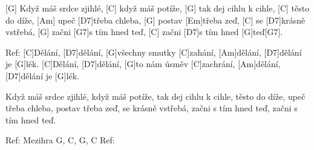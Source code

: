 

[G] Když máš srdce zjihlé, [C] když máš potíže, 
[G] tak dej cihlu k cihle, [C] těsto do díže, 
[Am] upeč [D7]třeba chleba, [G] postav [Em]třeba zeď,
[C]  se [D7]krásně vstřebá, 
[G] začni [G7]s tím hned teď, 
[C] začni [D7]s tím hned [G]teď[G7].


Ref: [C]Dělání, [D7]dělání, [G]všechny smutky [C]zahání, 
[Am]dělání, [D7]dělání je [G]lék.
[C]Dělání, [D7]dělání, [G]to nám úsměv [C]zachrání, 
[Am]dělání, [D7]dělání je [G]lék.

Když máš srdce zjihlé, když máš potíže, 
tak dej cihlu k cihle, těsto do díže, 
upeč třeba chleba, postav třeba zeď,
 se krásně vstřebá, začni s tím hned teď, 
začni s tím hned teď.

Ref: 
Mezihra G, C, G, C
Ref: 